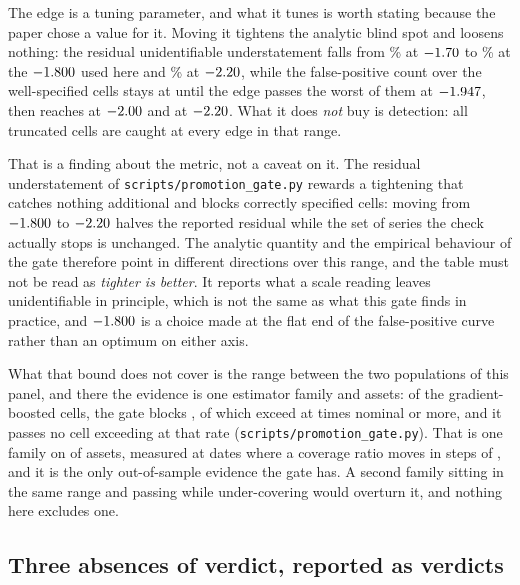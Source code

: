 \documentclass[preprint,11pt,authoryear]{elsarticle}
\newcommand{\1}{\boldsymbol{1}}
\begin{document}
The edge is a tuning parameter, and what it tunes is worth stating because the
paper chose a value for it. Moving it tightens the analytic blind spot and
loosens nothing: the residual unidentifiable understatement falls from
\nUndBandLoose\% at $-1.70$ to \nGapUndGateNow\% at the $-1.800$ used
here and \nUndBandVeryStrict\% at $-2.20$, while the false-positive
count over the \nBandGoodCells{} well-specified cells stays at
\nBandFPAtNow{} until the edge passes the worst of them at
$-1.947$, then reaches \nBandFPAtStrict{} at $-2.00$ and
\nBandFPAtVeryStrict{} at $-2.20$. What it does \emph{not} buy is
detection: all \nBandTruncCells{} truncated cells are caught at every edge in
that range.

That is a finding about the metric, not a caveat on it. The residual
understatement of \texttt{scripts/promotion\_gate.py} rewards a tightening that catches nothing
additional and blocks \nBandFPAtVeryStrict{} correctly specified cells: moving
from $-1.800$ to $-2.20$ halves the reported residual while the
set of series the check actually stops is unchanged. The analytic quantity and
the empirical behaviour of the gate therefore point in different directions
over this range, and the table must not be read as \emph{tighter is better}. It
reports what a scale reading leaves unidentifiable in principle, which is not
the same as what this gate finds in practice, and $-1.800$ is a choice
made at the flat end of the false-positive curve rather than an optimum on
either axis.

What that bound does not cover is the range between the two populations of this
panel, and there the evidence is one estimator family and \nMLAssets{} assets:
of the \nMLGbmCells{} gradient-boosted cells, the gate blocks \nMLGbmBlocked, of
which \nMLBlockedUnder{} exceed at \nMLUnderThreshold{} times nominal or more,
and it passes no cell exceeding at that rate (\texttt{scripts/promotion\_gate.py}).
That is one family on \nMLAssets{} of \nMainAssets{} assets, measured at
\nMLDates{} dates where a coverage ratio moves in steps of \nMLPiGrid, and it is
the only out-of-sample evidence the gate has. A second family sitting in the same
range and passing while under-covering would overturn it, and nothing here
excludes one.

\subsection{Three absences of verdict, reported as verdicts}
\label{sec:absences}
\end{document}
